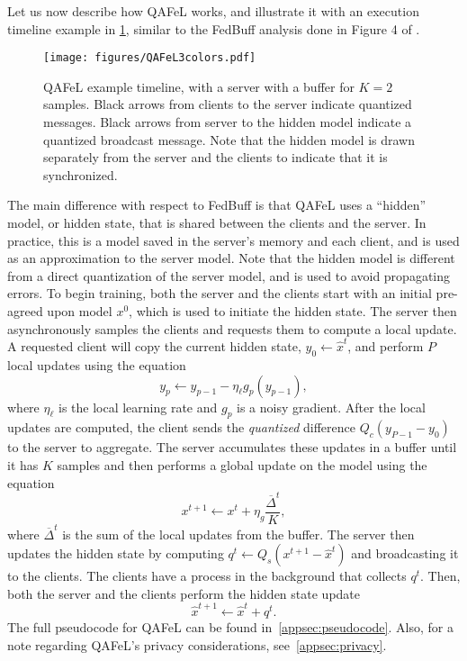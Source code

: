 \documentclass[nohyperref]{article}
\theoremstyle{plain}
\theoremstyle{definition}
\theoremstyle{remark}
\newcommand{\algname}{{QAFeL}\xspace} %
\begin{document}
Let us now describe how \algname works, and illustrate it with an execution timeline example in \cref{fig:timeline_diagram}, similar to the FedBuff analysis done in Figure 4 of \cite{papaya}.
\begin{figure}[htbp]
    \centering
    \texttt{[image: figures/QAFeL3colors.pdf]}
    \caption{\algname example timeline, with a server with a buffer for $K=2$ samples. Black arrows from clients to the server indicate quantized messages. Black arrows from server to the hidden model indicate a quantized broadcast message. Note that the hidden model is drawn separately from the server and the clients to indicate that it is synchronized.}
    \label{fig:timeline_diagram}
\end{figure}
The main difference with respect to FedBuff is that \algname uses a ``hidden'' model, or hidden state, that is shared between the clients and the server.
In practice, this is a model saved in the server's memory and each client, and is used as an approximation to the server model.
Note that the hidden model is different from a direct quantization of the server model, and is used to avoid propagating errors.
To begin training, both the server and the clients start with an initial pre-agreed upon model $x^0$, which is used to initiate the hidden state.
The server then asynchronously samples the clients and requests them to compute a local update.
A requested client will copy the current hidden state, $y_0 \leftarrow\hat x^t$, and perform $P$ local updates using the equation
\begin{equation}
    y_p \leftarrow y_{p-1} - \eta_{\ell} g_p(y_{p-1} ),
\end{equation}
where $\eta_{\ell}$ is the local learning rate and $g_p$ is a noisy gradient.
After the local updates are computed, the client sends the \emph{quantized} difference $Q_c(y_{P-1} - y_0)$ to the server to aggregate.
The server accumulates these updates in a buffer until it has $K$ samples and then performs a global update on the model using the equation
\begin{equation}
    x^{t+1} \leftarrow x^t + \eta_g \frac{\overline{\Delta}^t}{K},
\end{equation}
where $\overline{\Delta}^t$ is the sum of the local updates from the buffer.
The server then updates the hidden state by computing $q^t \leftarrow Q_s(x^{t+1} - \hat x^t)$ and broadcasting it to the clients.
The clients have a process in the background that collects $q^t$.
Then, both the server and the clients perform the hidden state update
\begin{equation}
    \hat x^{t+1} \leftarrow \hat x^t + q^t.
\end{equation}
The full pseudocode for \algname can be found in~\cref{appsec:pseudocode}.
Also, for a note regarding \algname's privacy considerations, see~\cref{appsec:privacy}.
\end{document}

